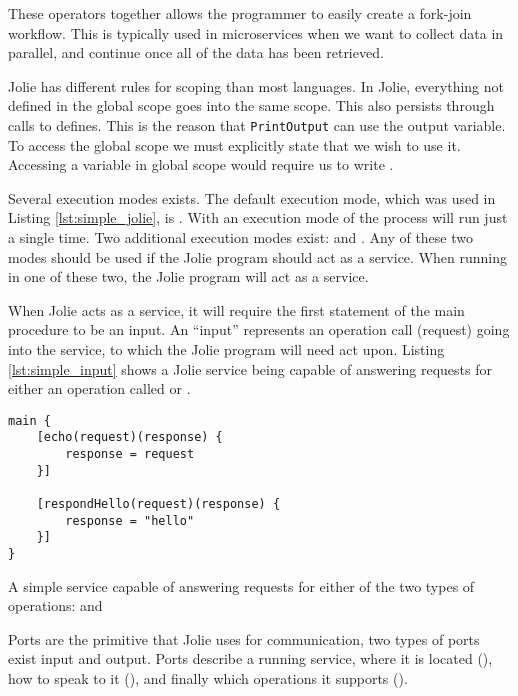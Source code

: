 These operators together allows the programmer to easily create a fork-join
workflow.  This is typically used in microservices when we want to collect data
in parallel, and continue once all of the data has been retrieved.

Jolie has different rules for scoping than most languages. In Jolie, everything
not defined in the global scope goes into the same scope. This also persists
through calls to defines. This is the reason that \verb!PrintOutput! can use
the output variable. To access the global scope we must explicitly state that
we wish to use it. Accessing a variable  in global scope would
require us to write .

Several execution modes exists. The default execution mode, which was used in
Listing \ref{lst:simple_jolie}, is . With an execution mode of
 the  process will run just a single time. Two
additional execution modes exist:  and .
Any of these two modes should be used if the Jolie program should act as a
service. When running in one of these two, the Jolie program will act as a
service.

When Jolie acts as a service, it will require the first statement of the main
procedure to be an input. An ``input'' represents an operation call (request)
going into the service, to which the Jolie program will need act upon.  Listing
\ref{lst:simple_input} shows a Jolie service being capable of answering
requests for either an operation called  or .

\begin{listing}[H]
\begin{verbatim}
main {
    [echo(request)(response) {
        response = request
    }]

    [respondHello(request)(response) {
        response = "hello"
    }]
}
\end{verbatim}

\caption{A simple service capable of answering requests for either of the two
    types of operations:  and }

\label{lst:simple_input}
\end{listing}

Ports are the primitive that Jolie uses for communication, two types of ports
exist input and output. Ports describe a running service, where it is located
(), how to speak to it (), and finally which
operations it supports ().

